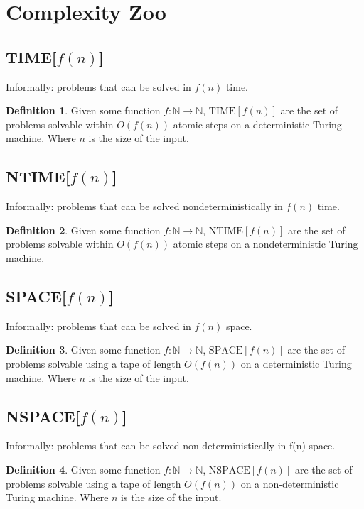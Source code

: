 \documentclass[]{article}
\theoremstyle{definition}
\newtheorem{definition}{Definition}[section]
\begin{document}
	
\section{Complexity Zoo}

\subsection{TIME[$f(n)$]}
\label{sec:TIME}
Informally: problems that can be solved in $f(n)$ time. 
\begin{definition}
	Given some function $f : \mathbb{N} \to \mathbb{N}$, $\text{TIME}[f(n)]$ are the set of problems solvable within $O(f(n))$ atomic steps on a deterministic Turing machine. Where $n$ is the size of the input.
\end{definition}

\subsection{NTIME[$f(n)$]}
\label{sec:NTIME}
Informally: problems that can be solved nondeterministically in $f(n)$ time. 
\begin{definition}
	Given some function $f : \mathbb{N} \to \mathbb{N}$, $\text{NTIME}[f(n)]$ are the set of problems solvable within $O(f(n))$ atomic steps on a nondeterministic Turing machine.
\end{definition}

\subsection{SPACE[$f(n)$]}
\label{sec:SPACE}
Informally: problems that can be solved in $f(n)$ space. 
\begin{definition}
	Given some function $f : \mathbb{N} \to \mathbb{N}$, $\text{SPACE}[f(n)]$ are the set of problems solvable using a tape of length $O(f(n))$ on a deterministic Turing machine. Where $n$ is the size of the input.
\end{definition}

\subsection{NSPACE[$f(n)$]}
\label{sec:NSPACE}
Informally: problems that can be solved non-deterministically in f(n) space. 
\begin{definition}
	Given some function $f : \mathbb{N} \to \mathbb{N}$, $\text{NSPACE}[f(n)]$ are the set of problems solvable using a tape of length $O(f(n))$ on a non-deterministic Turing machine. Where $n$ is the size of the input.
\end{definition}
\end{document}
